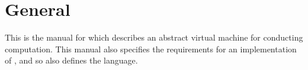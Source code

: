 \chapter{General}

This is the manual for \lepix{} which describes an abstract virtual machine for conducting computation. This manual also specifies the requirements for an implementation of \lepix{}, and so also defines the \lepix{} language.